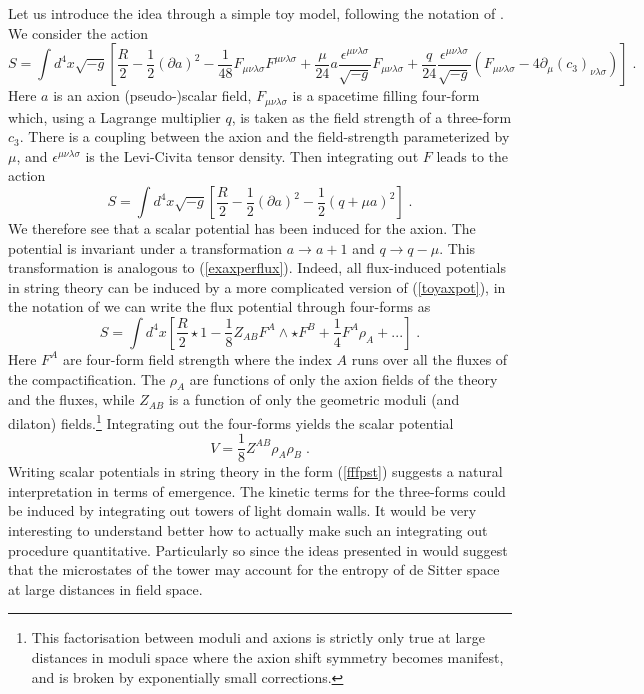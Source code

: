 \documentclass[11pt,a4paper]{article}
\numberwithin{equation}{section}
\numberwithin{table}{section}\setlength{\multlinegap}{25pt}
\newcommand{\be}{\begin{equation}}
\newcommand{\ee}{\end{equation}}
\begin{document}
{Let us introduce the idea through a simple toy model, following the notation of \cite{Kaloper:2008fb}.  We consider the action
\be
S = \int d^4x \sqrt{-g} \left[ \frac{R}{2} - \frac12 \left(\partial a\right)^2 - \frac{1}{48} F_{\mu\nu\lambda\sigma}F^{\mu\nu\lambda\sigma} + \frac{\mu}{24} a \frac{\epsilon^{\mu\nu\lambda\sigma}}{\sqrt{-g}}F_{\mu\nu\lambda\sigma} + \frac{q}{24} \frac{\epsilon^{\mu\nu\lambda\sigma}}{\sqrt{-g}} \left(F_{\mu\nu\lambda\sigma} - 4 \partial_{\mu} \left(c_3\right)_{\nu\lambda\sigma} \right) \right] \;.
\label{toyaxpot}
\ee
Here $a$ is an axion (pseudo-)scalar field, $F_{\mu\nu\lambda\sigma}$ is a spacetime filling four-form which, using a Lagrange multiplier $q$, is taken as the field strength of a three-form $c_3$. There is a coupling between the axion and the field-strength parameterized by $\mu$, and $\epsilon^{\mu\nu\lambda\sigma}$ is the Levi-Civita tensor density. Then integrating out $F$ leads to the action \cite{Kaloper:2008fb}
\be
S = \int d^4x \sqrt{-g} \left[ \frac{R}{2} - \frac12 \left(\partial a\right)^2 - \frac12 \left(q+ \mu a \right)^2 \right] \;.
\ee
We therefore see that a scalar potential has been induced for the axion. The potential is invariant under a transformation $a \rightarrow a + 1$ and $q \rightarrow q - \mu$. This transformation is analogous to (\ref{exaxperflux}). Indeed, all flux-induced potentials in string theory can be induced by a more complicated version of (\ref{toyaxpot}), in the notation of \cite{Herraez:2018vae} we can write the flux potential through four-forms as 
\be
S = \int d^4 x \left[ \frac{R}{2} \star 1- \frac{1}{8} Z_{AB} F^A \wedge \star F^B + \frac{1}{4} F^A \rho_A + ... \right] \;. 
\label{fffpst}
\ee
Here $F^A$ are four-form field strength where the index $A$ runs over all the fluxes of the compactification. The $\rho_A$ are functions of only the axion fields of the theory and the fluxes, while $Z_{AB}$ is a function of only the geometric moduli (and dilaton) fields.\footnote{This factorisation between moduli and axions is strictly only true at large distances in moduli space where the axion shift symmetry becomes manifest, and is broken by exponentially small corrections.} Integrating out the four-forms yields the scalar potential
\be
V = \frac18 Z^{AB} \rho_A \rho_B \;.
\ee
Writing scalar potentials in string theory in the form (\ref{fffpst}) suggests a natural interpretation in terms of emergence. The kinetic terms for the three-forms could be induced by integrating out towers of light domain walls. It would be very interesting to understand better how to actually make such an integrating out procedure quantitative. Particularly so since the ideas presented in \cite{Ooguri:2018wrx} would suggest that the microstates of the tower may account for the entropy of de Sitter space at large distances in field space.

}
\end{document}

